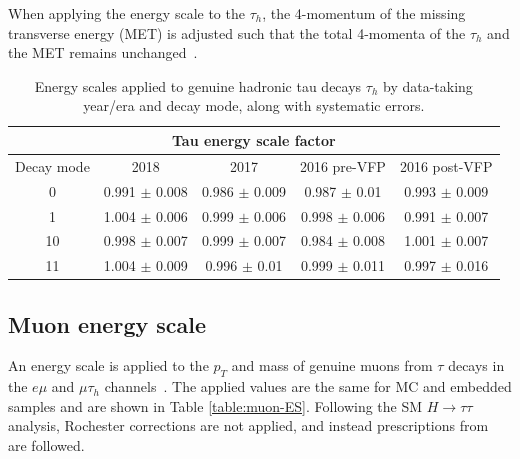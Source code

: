 When applying the energy scale to the $\tau_{h}$, the 4-momentum of the missing transverse energy (MET) is adjusted such that the total 4-momenta of the $\tau_{h}$ and the MET remains unchanged~\cite{twiki_TAU_POG_tauidrecommendationforrun2}.

\begin{table}[ht]
    \centering
    \begin{tabular}{|c|c|c|c|c|}
    \hline
    \multicolumn{5}{|c|}{Tau energy scale factor}                                   \\ \hline
    \hline
    Decay mode      & 2018              & 2017              & 2016 pre-VFP      & 2016 post-VFP     \\ \hline
    0               & 0.991 $\pm$ 0.008 & 0.986 $\pm$ 0.009 & 0.987 $\pm$ 0.01  & 0.993 $\pm$ 0.009 \\
    1               & 1.004 $\pm$ 0.006 & 0.999 $\pm$ 0.006 & 0.998 $\pm$ 0.006 & 0.991 $\pm$ 0.007 \\
    10              & 0.998 $\pm$ 0.007 & 0.999 $\pm$ 0.007 & 0.984 $\pm$ 0.008 & 1.001 $\pm$ 0.007 \\
    11              & 1.004 $\pm$ 0.009 & 0.996 $\pm$ 0.01  & 0.999 $\pm$ 0.011 & 0.997 $\pm$ 0.016 \\ \hline
    \end{tabular}
    \caption{Energy scales applied to genuine hadronic tau decays $\tau_{h}$ by data-taking year/era and decay mode, along with systematic errors.}
    \label{table:tau-ES}
\end{table}

\subsection{Muon energy scale}
\label{sec:muon_energy_scale}

An energy scale is applied to the $p_{T}$ and mass of genuine muons from $\tau$ decays in the $e\mu$ and $\mu\tau_{h}$ channels~\cite{twiki_MUON_POG_recommendation}. The applied values are the same for MC and embedded samples and are shown in Table \ref{table:muon-ES}. Following the SM $H \rightarrow \tau\tau$ analysis, Rochester corrections are not applied, and instead prescriptions from~\cite{twiki_MUO_simplified_ES} are followed.


